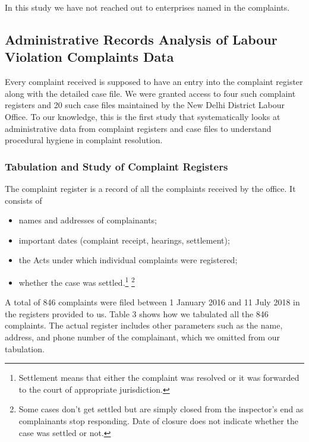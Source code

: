 \documentclass[a4paper, 12pt, twoside]{article}
\begin{document}
In this study we have not reached out to enterprises named in the complaints. 

\subsection{Administrative Records Analysis of Labour Violation Complaints Data}

Every complaint received is supposed to have an entry into the complaint register along with the detailed case file. We were granted access to four such complaint registers and 20 such case files maintained by the New Delhi District Labour Office. To our knowledge, this is the first study that systematically looks at administrative data from complaint registers and case files to understand procedural hygiene in complaint resolution. \\

\subsubsection{Tabulation and Study of Complaint Registers}

The complaint register is a record of all the complaints received by the office. It consists of 
\begin{itemize}
\item names and addresses of complainants; 
\item important dates (complaint receipt, hearings, settlement); 
\item the Acts under which individual complaints were registered; 
\item whether the case was settled.\footnote{Settlement means that either the complaint was resolved or it was forwarded to the court of appropriate jurisdiction.} \footnote{Some cases don’t get settled but are simply closed from the inspector’s end as complainants stop responding. Date of closure does not indicate whether the case was settled or not.} 
\end{itemize}
 
A total of 846 complaints were filed between 1 January 2016 and 11 July 2018 in the registers provided to us. Table 3 shows how we tabulated all the 846 complaints. The actual register includes other parameters such as the name, address, and phone number of the complainant, which we omitted from our tabulation. \\
\end{document}

